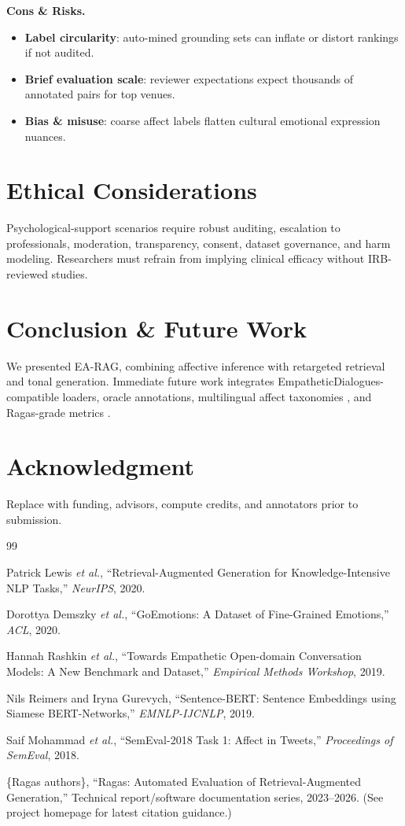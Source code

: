 \documentclass[conference]{IEEEtran}
\begin{document}
\textbf{Cons \& Risks.}
\begin{itemize}
  \item \textbf{Label circularity}: auto-mined grounding sets can inflate or distort rankings if not audited.
  \item \textbf{Brief evaluation scale}: reviewer expectations expect thousands of annotated pairs for top venues.
  \item \textbf{Bias \& misuse}: coarse affect labels flatten cultural emotional expression nuances.
\end{itemize}

\section{Ethical Considerations}
\label{sec:ethical}
Psychological-support scenarios require robust auditing, escalation to professionals, moderation, transparency, consent, dataset governance, and harm modeling. Researchers must refrain from implying clinical efficacy without IRB-reviewed studies.

\section{Conclusion \& Future Work}
We presented EA-RAG, combining affective inference with retargeted retrieval and tonal generation. Immediate future work integrates EmpatheticDialogues-compatible loaders, oracle annotations, multilingual affect taxonomies \cite{mohammad2018semeval}, and Ragas-grade metrics \cite{ragas2023}.

\section*{Acknowledgment}
Replace with funding, advisors, compute credits, and annotators prior to submission.

\begin{thebibliography}{99}

Patrick Lewis \emph{et al.},
``Retrieval-Augmented Generation for Knowledge-Intensive NLP Tasks,''
\textit{NeurIPS}, 2020.

Dorottya Demszky \emph{et al.},
``GoEmotions: A Dataset of Fine-Grained Emotions,''
\textit{ACL}, 2020.

Hannah Rashkin \emph{et al.},
``Towards Empathetic Open-domain Conversation Models: A New Benchmark and Dataset,''
\textit{Empirical Methods Workshop}, 2019.

Nils Reimers and Iryna Gurevych,
``Sentence-BERT: Sentence Embeddings using Siamese BERT-Networks,''
\textit{EMNLP-IJCNLP}, 2019.

Saif Mohammad \emph{et al.},
``SemEval-2018 Task 1: Affect in Tweets,''
\textit{Proceedings of SemEval}, 2018.

\{Ragas authors\}, ``Ragas: Automated Evaluation of Retrieval-Augmented Generation,''
Technical report/software documentation series, 2023--2026. (See project homepage for latest citation guidance.)

\end{thebibliography}
\end{document}
